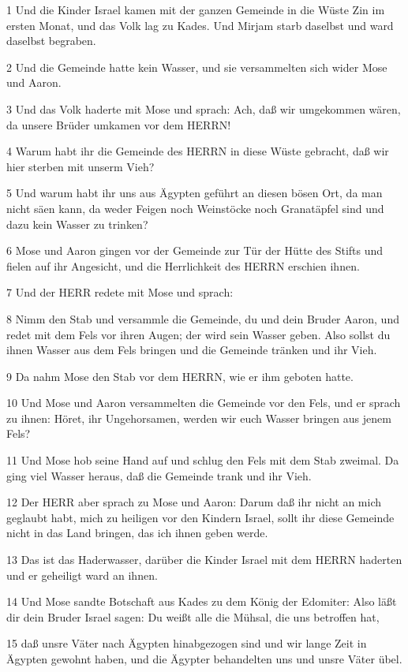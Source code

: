 \par 1 Und die Kinder Israel kamen mit der ganzen Gemeinde in die Wüste Zin im ersten Monat, und das Volk lag zu Kades. Und Mirjam starb daselbst und ward daselbst begraben.
\par 2 Und die Gemeinde hatte kein Wasser, und sie versammelten sich wider Mose und Aaron.
\par 3 Und das Volk haderte mit Mose und sprach: Ach, daß wir umgekommen wären, da unsere Brüder umkamen vor dem HERRN!
\par 4 Warum habt ihr die Gemeinde des HERRN in diese Wüste gebracht, daß wir hier sterben mit unserm Vieh?
\par 5 Und warum habt ihr uns aus Ägypten geführt an diesen bösen Ort, da man nicht säen kann, da weder Feigen noch Weinstöcke noch Granatäpfel sind und dazu kein Wasser zu trinken?
\par 6 Mose und Aaron gingen vor der Gemeinde zur Tür der Hütte des Stifts und fielen auf ihr Angesicht, und die Herrlichkeit des HERRN erschien ihnen.
\par 7 Und der HERR redete mit Mose und sprach:
\par 8 Nimm den Stab und versammle die Gemeinde, du und dein Bruder Aaron, und redet mit dem Fels vor ihren Augen; der wird sein Wasser geben. Also sollst du ihnen Wasser aus dem Fels bringen und die Gemeinde tränken und ihr Vieh.
\par 9 Da nahm Mose den Stab vor dem HERRN, wie er ihm geboten hatte.
\par 10 Und Mose und Aaron versammelten die Gemeinde vor den Fels, und er sprach zu ihnen: Höret, ihr Ungehorsamen, werden wir euch Wasser bringen aus jenem Fels?
\par 11 Und Mose hob seine Hand auf und schlug den Fels mit dem Stab zweimal. Da ging viel Wasser heraus, daß die Gemeinde trank und ihr Vieh.
\par 12 Der HERR aber sprach zu Mose und Aaron: Darum daß ihr nicht an mich geglaubt habt, mich zu heiligen vor den Kindern Israel, sollt ihr diese Gemeinde nicht in das Land bringen, das ich ihnen geben werde.
\par 13 Das ist das Haderwasser, darüber die Kinder Israel mit dem HERRN haderten und er geheiligt ward an ihnen.
\par 14 Und Mose sandte Botschaft aus Kades zu dem König der Edomiter: Also läßt dir dein Bruder Israel sagen: Du weißt alle die Mühsal, die uns betroffen hat,
\par 15 daß unsre Väter nach Ägypten hinabgezogen sind und wir lange Zeit in Ägypten gewohnt haben, und die Ägypter behandelten uns und unsre Väter übel.
